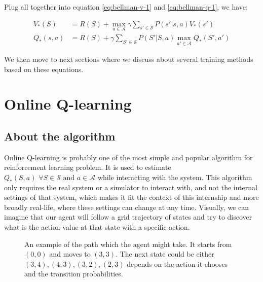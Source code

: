 \documentclass[
  a4paper, xcolor = usenames,dvipsnames]{article}
\begin{document}
Plug all together into equation \eqref{eq:bellman-v-1} and \eqref{eq:bellman-q-1}, we have:

\begin{align}
V_{*}(S) &= R(S) + \max_{a \in \mathcal{A}} \gamma \sum_{s' \in \mathcal{S}} P(s' | s, a) V_{*}(s')
\label{eq:bellman-max-v} \\
Q_{*}(s, a) &= R(S) + \gamma \sum_{S' \in \mathcal{S}} P(S' | S, a) \max_{a' \in \mathcal{A}} Q_{*}(S', a')
\label{eq:bellman-max-q}
\end{align}

We then move to next sections where we discuss about several training methods based on these equations.

\hypertarget{online-q-learning}{%
\section{Online Q-learning}\label{online-q-learning}}

\hypertarget{about-the-algorithm}{%
\subsection{About the algorithm}\label{about-the-algorithm}}

Online Q-learning is probably one of the most simple and popular algorithm for reinforcement learning problem. It is used to estimate \(Q_{*}(S, a) \,\, \forall S \in \mathcal{S} \text{ and } a \in \mathcal{A}\) while interacting with the system. This algorithm only requires the real system or a simulator to interact with, and not the internal settings of that system, which makes it fit the context of this internship and more broadly real-life, where these settings can change at any time. Visually, we can imagine that our agent will follow a grid trajectory of states and try to discover what is the action-value at that state with a specific action.

\begin{figure}
\centering
\def\mycolumns{5}
\def\myrows{5}
\caption[An example of the path which the agent might take]{An example of the path which the agent might take. It starts from $(0, 0)$ and moves to $(3, 3)$. The next state could be either $(3, 4), (4, 3), (3, 2), (2, 3)$ depends on the action it chooses and the transition probabilities.}
\end{figure}
\end{document}
